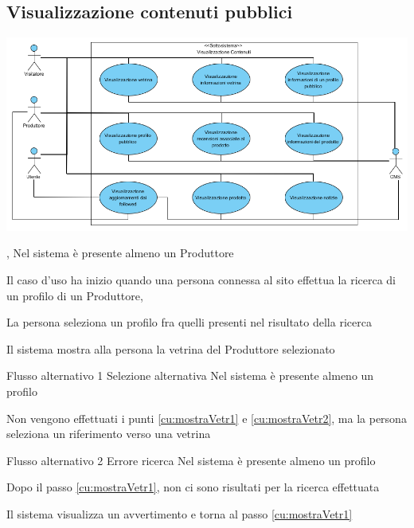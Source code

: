 \subsection{Visualizzazione contenuti pubblici}
\begin{center}
   \includegraphics[width=\textwidth]{assets/visualParadigm/Visualizzazione}
\end{center}
{, }
{Nel sistema è presente almeno un Produttore}
{\postNulle}
{\begin{enumCU}
	\item Il caso d'uso ha inizio quando una persona connessa al sito effettua la ricerca di un profilo di un Produttore, \label{cu:mostraVetr1}
	\item La persona seleziona un profilo fra quelli presenti nel risultato della ricerca\label{cu:mostraVetr2}
	\item Il sistema mostra alla persona la vetrina del Produttore selezionato
\end{enumCU}}
%
%
{Flusso alternativo 1}%
{Selezione alternativa}%
{Nel sistema è presente almeno un profilo}%
{\postNulle}%
{\begin{enumCU}
	\item Non vengono effettuati i punti \ref{cu:mostraVetr1} e \ref{cu:mostraVetr2}, ma la persona seleziona un \gls{riferimento} verso una vetrina
\end{enumCU}}%
%
%
{Flusso alternativo 2}%
{Errore ricerca}%
{Nel sistema è presente almeno un profilo}%
{\postNulle}%
{\begin{enumCU}
	\item Dopo il passo \ref{cu:mostraVetr1}, non ci sono risultati per la ricerca effettuata
	\item Il sistema visualizza un avvertimento e torna al passo \ref{cu:mostraVetr1}
\end{enumCU}}%

